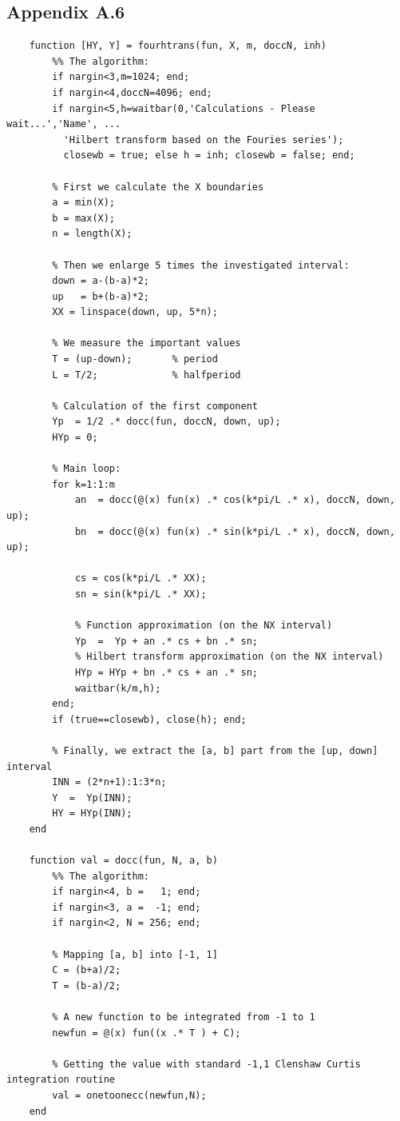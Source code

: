 \documentclass[12pt,twoside,a4paper]{article}
\numberwithin{equation}{subsection}
\numberwithin{figure}{subsection}
\begin{document}
\subsection*{Appendix A.6}
\begin{lstlisting}
	function [HY, Y] = fourhtrans(fun, X, m, doccN, inh)
	    %% The algorithm:
	    if nargin<3,m=1024; end;
	    if nargin<4,doccN=4096; end;
	    if nargin<5,h=waitbar(0,'Calculations - Please wait...','Name', ...
	      'Hilbert transform based on the Fouries series'); 
	      closewb = true; else h = inh; closewb = false; end;
	
	    % First we calculate the X boundaries
	    a = min(X);       
	    b = max(X);
	    n = length(X);
	
	    % Then we enlarge 5 times the investigated interval:
	    down = a-(b-a)*2; 
	    up   = b+(b-a)*2;
	    XX = linspace(down, up, 5*n);
	
	    % We measure the important values
	    T = (up-down);       % period
	    L = T/2;             % halfperiod
	
	    % Calculation of the first component
	    Yp  = 1/2 .* docc(fun, doccN, down, up);
	    HYp = 0;
	
	    % Main loop:
	    for k=1:1:m
	        an  = docc(@(x) fun(x) .* cos(k*pi/L .* x), doccN, down, up);
	        bn  = docc(@(x) fun(x) .* sin(k*pi/L .* x), doccN, down, up);
	
	        cs = cos(k*pi/L .* XX);
	        sn = sin(k*pi/L .* XX);
	        
	        % Function approximation (on the NX interval)
	        Yp  =  Yp + an .* cs + bn .* sn;
	        % Hilbert transform approximation (on the NX interval)
	        HYp = HYp + bn .* cs + an .* sn;
	        waitbar(k/m,h);
	    end; 
	    if (true==closewb), close(h); end;
	
	    % Finally, we extract the [a, b] part from the [up, down] interval
	    INN = (2*n+1):1:3*n;
	    Y  =  Yp(INN); 
	    HY = HYp(INN); 
	end
	
	function val = docc(fun, N, a, b)    
	    %% The algorithm:
	    if nargin<4, b =   1; end;
	    if nargin<3, a =  -1; end;
	    if nargin<2, N = 256; end;
	
	    % Mapping [a, b] into [-1, 1]
	    C = (b+a)/2;
	    T = (b-a)/2;
	    
	    % A new function to be integrated from -1 to 1    
	    newfun = @(x) fun((x .* T ) + C);
	
	    % Getting the value with standard -1,1 Clenshaw Curtis integration routine
	    val = onetoonecc(newfun,N);
	end
	    

\end{lstlisting}
\end{document}
